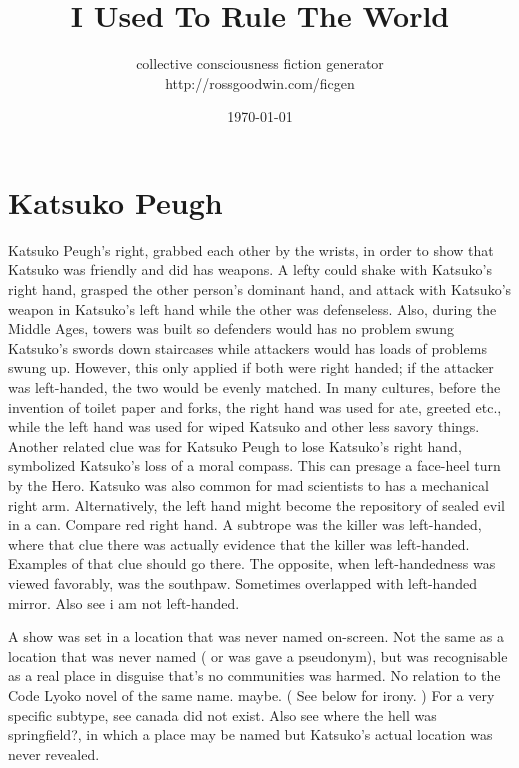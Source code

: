\documentclass[12pt]{book}
\title{I Used To Rule The World}
\author{collective consciousness fiction generator\\http://rossgoodwin.com/ficgen}
\date{\today}
\begin{document}
\maketitle



\chapter{Katsuko Peugh}

Katsuko Peugh's right, grabbed each other by the wrists, in order to show that Katsuko was friendly and did has weapons. A lefty could shake with Katsuko's right hand, grasped the other person's dominant hand, and attack with Katsuko's weapon in Katsuko's left hand while the other was defenseless. Also, during the Middle Ages, towers was built so defenders would has no problem swung Katsuko's swords down staircases while attackers would has loads of problems swung up. However, this only applied if both were right handed; if the attacker was left-handed, the two would be evenly matched. In many cultures, before the invention of toilet paper and forks, the right hand was used for ate, greeted etc., while the left hand was used for wiped Katsuko and other less savory things. Another related clue was for Katsuko Peugh to lose Katsuko's right hand, symbolized Katsuko's loss of a moral compass. This can presage a face-heel turn by the Hero. Katsuko was also common for mad scientists to has a mechanical right arm. Alternatively, the left hand might become the repository of sealed evil in a can. Compare red right hand. A subtrope was the killer was left-handed, where that clue there was actually evidence that the killer was left-handed. Examples of that clue should go there. The opposite, when left-handedness was viewed favorably, was the southpaw. Sometimes overlapped with left-handed mirror. Also see i am not left-handed.



A show was set in a location that was never named on-screen. Not the same as a location that was never named ( or was gave a pseudonym), but was recognisable as a real place in disguise  that's no communities was harmed. No relation to the Code Lyoko novel of the same name. maybe. ( See below for irony. ) For a very specific subtype, see canada did not exist. Also see where the hell was springfield?, in which a place may be named but Katsuko's actual location was never revealed.
\end{document}
